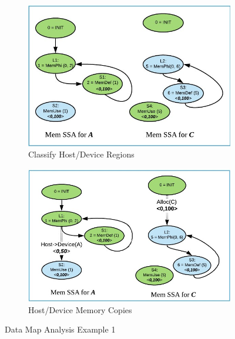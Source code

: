 \begin{figure}[h!]
    ~ %
    \begin{subfigure}[b]{0.46\textwidth}
        \includegraphics[width=\textwidth]{images/memorySSA-example1-s2.jpg}
        \caption{Classify Host/Device Regions}
        \label{fig:memorySSA-example1-s2}
    \end{subfigure}
    \begin{subfigure}[b]{0.51\textwidth}
        \includegraphics[width=\textwidth]{images/memorySSA-example1-s3.jpg}
        \caption{Host/Device Memory Copies}
        \label{fig:memorySSA-example1-s3}
    \end{subfigure}
    \caption{Data Map Analysis Example 1} 
    \label{fig:memorySSA-example1}
\end{figure}

